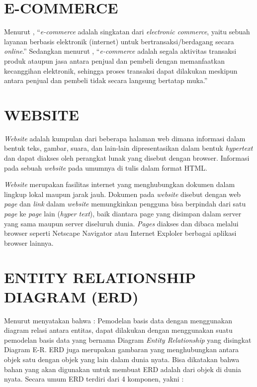 \section{\uppercase{E-commerce}}
Menurut \cite{yuhefizar2013} , “\textit{e-commerce} adalah singkatan dari \textit{electronic commerce}, yaitu sebuah layanan berbasis elektronik (internet) untuk bertransaksi/berdagang secara \textit{online}.” Sedangkan menurut \cite{saputra2013}, “\textit{e-commerce} adalah segala aktivitas transaksi produk ataupun jasa antara penjual dan pembeli dengan memanfaatkan kecanggihan elektronik, sehingga proses transaksi dapat dilakukan meskipun antara penjual dan pembeli tidak secara langsung bertatap muka.”

\section{\uppercase{Website}}
\textit{Website} adalah kumpulan dari beberapa halaman web dimana informasi dalam bentuk teks, gambar, suara, dan lain-lain dipresentasikan dalam bentuk \textit{hypertext} dan dapat diakses oleh perangkat lunak yang disebut dengan browser. Informasi pada sebuah \textit{website} pada umumnya di tulis dalam format HTML.

\par \textit{Website} merupakan fasilitas internet yang menghubungkan dokumen dalam lingkup lokal maupun jarak jauh. Dokumen pada \textit{website} disebut dengan web \textit{page} dan \textit{link} dalam \textit{website} memungkinkan pengguna bisa berpindah dari satu \textit{page} ke \textit{page} lain (\textit{hyper text}), baik diantara page yang disimpan dalam server yang sama maupun server diseluruh dunia. \textit{Pages} diakses dan dibaca melalui browser seperti Netscape Navigator atau Internet Exploler berbagai aplikasi browser lainnya. \citep{hakim2004}

\section{\uppercase{Entity Relationship Diagram (ERD)}}
Menurut \cite{priyadi2014} menyatakan bahwa : Pemodelan basis data dengan menggunakan diagram relasi antara entitas, dapat dilakukan dengan menggunakan suatu pemodelan basis data yang bernama Diagram \textit{Entity Relationship} yang disingkat Diagram E-R. ERD juga merupakan gambaran yang menghubungkan antara objek satu dengan objek yang lain dalam dunia nyata. Bisa dikatakan bahwa bahan yang akan digunakan untuk membuat ERD adalah dari objek di dunia nyata. Secara umum ERD terdiri dari 4 komponen, yakni :

